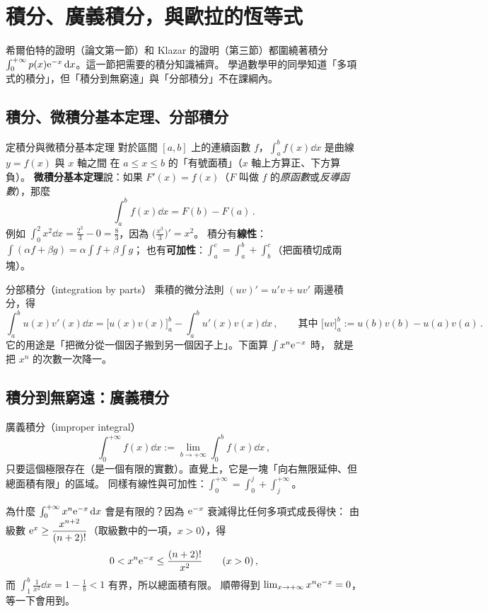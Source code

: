\section{積分、廣義積分，與歐拉的恆等式}\label{sec:calc}

希爾伯特的證明（論文第一節）和 Klazar 的證明（第三節）都圍繞著積分
$\int_0^{+\infty}p(x)\mathrm{e}^{-x}\,\mathrm{d} x$。這一節把需要的積分知識補齊。
學過數學甲的同學知道「多項式的積分」，但「積分到無窮遠」與「分部積分」不在課綱內。

\subsection{積分、微積分基本定理、分部積分}

\begin{prereq}{定積分與微積分基本定理}
對於區間 $[a,b]$ 上的連續函數 $f$，$\int_a^b f(x)\dd x$ 是曲線 $y=f(x)$ 與 $x$ 軸之間
在 $a\le x\le b$ 的「有號面積」（$x$ 軸上方算正、下方算負）。
\textbf{微積分基本定理}說：如果 $F'(x)=f(x)$（$F$ 叫做 $f$ 的\emph{原函數}或\emph{反導函數}），那麼
\[
  \int_a^b f(x)\dd x=F(b)-F(a)\,.
\]
例如 $\int_0^2 x^2\dd x=\frac{2^3}{3}-0=\frac83$，因為 $\big(\frac{x^3}{3}\big)'=x^2$。
積分有\textbf{線性}：$\int(\alpha f+\beta g)=\alpha\int f+\beta\int g$；
也有\textbf{可加性}：$\int_a^c=\int_a^b+\int_b^c$（把面積切成兩塊）。
\end{prereq}

\begin{prereq}{分部積分（integration by parts）}
乘積的微分法則 $(uv)'=u'v+uv'$ 兩邊積分，得
\[
  \int_a^b u(x)v'(x)\dd x=\Big[u(x)v(x)\Big]_a^b-\int_a^b u'(x)v(x)\dd x\,,
  \qquad\text{其中 }\Big[uv\Big]_a^b:=u(b)v(b)-u(a)v(a)\,.
\]
它的用途是「把微分從一個因子搬到另一個因子上」。下面算 $\int x^n\mathrm{e}^{-x}$ 時，
就是把 $x^n$ 的次數一次降一。
\end{prereq}

\subsection{積分到無窮遠：廣義積分}

\begin{prereq}{廣義積分（improper integral）}
\[
  \int_0^{+\infty}f(x)\dd x:=\lim_{b\to+\infty}\int_0^{b}f(x)\dd x\,,
\]
只要這個極限存在（是一個有限的實數）。直覺上，它是一塊「向右無限延伸、但總面積有限」的區域。
同樣有線性與可加性：$\int_0^{+\infty}=\int_0^{j}+\int_j^{+\infty}$。
\end{prereq}

為什麼 $\int_0^{+\infty}x^n\mathrm{e}^{-x}\,\mathrm{d} x$ 會是有限的？因為 $\mathrm{e}^{-x}$ 衰減得比任何多項式成長得快：
由級數 $\mathrm{e}^{x}\ge\dfrac{x^{n+2}}{(n+2)!}$（取級數中的一項，$x>0$），得
\[
  0<x^{n}\mathrm{e}^{-x}\le\frac{(n+2)!}{x^{2}}\qquad(x>0)\,,
\]
而 $\int_1^{b}\frac{1}{x^2}\dd x=1-\frac1b<1$ 有界，所以總面積有限。
順帶得到 $\lim_{x\to+\infty}x^n\mathrm{e}^{-x}=0$，等一下會用到。

